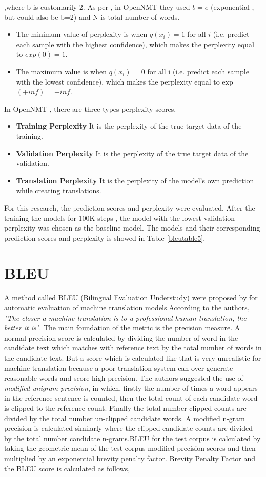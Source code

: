 ,where b is customarily 2. As per \cite{opennmtforum} , in OpenNMT they used $b = e$ (exponential , but could also be b=2) and N is total number of words.
\begin{itemize}
    \item The minimum value of perplexity is when $q(x_i) = 1$ for all $i$ (i.e. predict each sample with the highest confidence), which makes the perplexity equal to $exp(0) = 1.$
    \item The maximum value is when $q(x_i)$ = 0 for all i (i.e. predict each sample with the lowest confidence), which makes the perplexity equal to exp$(+inf) = +inf.$
\end{itemize}
In OpenNMT , there are three types perplexity scores,
\begin{itemize}
   \item \textbf{Training Perplexity} It is the perplexity of the true target data of the training.
    \item \textbf{Validation Perplexity} It is the perplexity of the true target data of the validation.
    \item \textbf{Translation Perplexity} It is the perplexity of the model’s own prediction while creating translations.
\end{itemize}
For this research, the prediction scores and perplexity were evaluated. After the training the models for 100K steps , the model with the lowest validation perplexity was chosen as the baseline model. The models and their corresponding prediction scores and perplexity is showed in Table \ref{bleutable5}.
\section{BLEU}
A method called BLEU (Bilingual Evaluation Understudy) were proposed by \cite{Papineni:2002:BMA:1073083.1073135} for automatic evaluation of machine translation models.According to the authors, \textit{"The closer a machine translation is to a professional
human translation, the better it is"}. The main foundation of the metric is the precision measure. A normal precision score is calculated by dividing the number of word in the candidate text which matches with reference text by the total number of words in the candidate text. But a score which is calculated like that is very unrealistic for machine translation because a poor translation system can over generate reasonable words and score high precision. The authors suggested the use of \textit{modified unigram precision}, in which, firstly the number of times a word appears in the reference sentence is counted, then the total count of each candidate word is clipped to the reference count. Finally the total number clipped counts are divided by the total number un-clipped candidate words. A modified n-gram precision is calculated similarly where the clipped candidate counts are divided by the total number candidate n-grams.BLEU for the test corpus is calculated by taking the geometric mean of the test corpus modified precision scores and then multiplied by an exponential brevity penalty factor. Brevity Penalty Factor and the BLEU score is calculated as follows,


